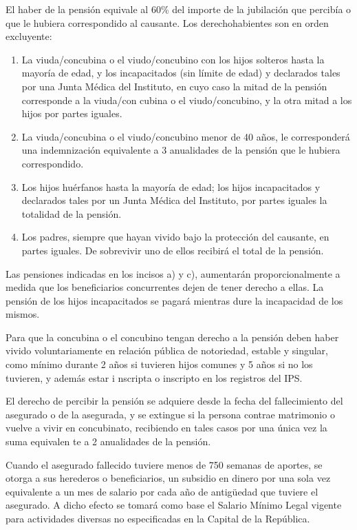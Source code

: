 El haber de la pensión equivale al 60\% del importe de la jubilación que
percibía o que le hubiera correspondido al causante. Los
derechohabientes son en orden excluyente:

\begin{enumerate}[label=\alph*.]

\item La viuda/concubina o el viudo/concubino con los hijos solteros hasta la mayoría de edad, y los incapacitados (sin límite de edad) y declarados tales por una Junta Médica del Instituto, en cuyo caso la mitad de la pensión corresponde a la viuda/con
cubina o el viudo/concubino, y la otra mitad a los hijos por partes iguales.

\item La viuda/concubina o el viudo/concubino menor de 40 años, le corresponderá una indemnización equivalente a 3 anualidades de la pensión que le hubiera correspondido. 

\item Los hijos huérfanos hasta la mayoría de edad; los hijos incapacitados y declarados tales por un Junta Médica del Instituto, por partes iguales la totalidad de la pensión. 

\item Los padres, siempre que hayan vivido bajo la protección del causante, en partes iguales. De sobrevivir uno de ellos recibirá el total de la pensión.

\end{enumerate}

Las pensiones indicadas en los incisos a) y c), aumentarán
proporcionalmente a medida que los beneficiarios concurrentes dejen de
tener derecho a ellas. La pensión de los hijos incapacitados se pagará
mientras dure la incapacidad de los mismos.

Para que la concubina o el concubino tengan derecho a la pensión deben
haber vivido voluntariamente en relación pública de notoriedad, estable
y singular, como mínimo durante 2 años si tuvieren hijos comunes y 5
años si no los tuvieren, y además estar i nscripta o inscripto en los
registros del IPS.

El derecho de percibir la pensión se adquiere desde la fecha del
fallecimiento del asegurado o de la asegurada, y se extingue si la
persona contrae matrimonio o vuelve a vivir en concubinato, recibiendo
en tales casos por una única vez la suma equivalen te a 2 anualidades de
la pensión.

Cuando el asegurado fallecido tuviere menos de 750 semanas de aportes,
se otorga a sus herederos o beneficiarios, un subsidio en dinero por una
sola vez equivalente a un mes de salario por cada año de antigüedad que
tuviere el asegurado. A dicho efecto se tomará como base el Salario
Mínimo Legal vigente para actividades diversas no especificadas en la
Capital de la República.

